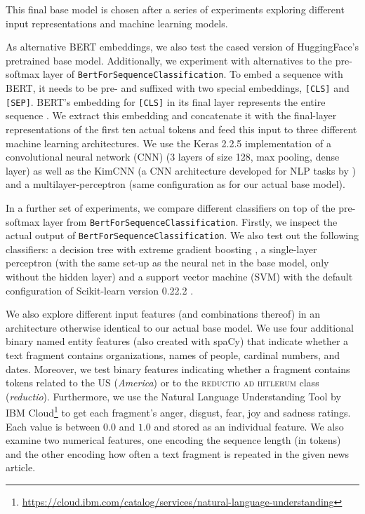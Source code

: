 \documentclass[11pt]{article}
\begin{document}
This final base model is chosen after a series of experiments exploring different input representations and machine learning models.

As alternative BERT embeddings, we also test the cased version of HuggingFace's pretrained base model.
Additionally, we experiment with alternatives to the pre-softmax layer of \texttt{BertForSequenceClassification}.
To embed a sequence with BERT, it needs to be pre- and suffixed with two special embeddings, \texttt{[CLS]} and \texttt{[SEP]}.
BERT's embedding for \texttt{[CLS]} in its final layer represents the entire sequence \cite{devlin2019bert}.
We extract this embedding and concatenate it with the final-layer representations of the first ten actual tokens and feed this input to three different machine learning architectures.
We use the Keras 2.2.5 implementation of a convolutional neural network (CNN) (3 layers of size 128, max pooling, dense layer)  as well as the KimCNN (a CNN architecture developed for NLP tasks by ) and a multilayer-perceptron (same configuration as for our actual base model).

In a further set of experiments, we compare different classifiers on top of the pre-softmax layer from \texttt{BertForSequenceClassification}.
Firstly, we inspect the actual output of \texttt{BertForSequenceClassification}.
We also test out the following classifiers: a decision tree with extreme gradient boosting \cite{chen2016xgboost}, a single-layer perceptron (with the same set-up as the neural net in the base model, only without the hidden layer) and a support vector machine (SVM) with the default configuration of Scikit-learn version 0.22.2 \cite{scikit-learn}.

We also explore different input features (and combinations thereof) in an architecture otherwise identical to our actual base model.
We use four additional binary named entity features (also created with spaCy) that indicate whether a text fragment contains organizations, names of people, cardinal numbers, and dates.
Moreover, we test binary features indicating whether a fragment contains tokens related to the US (\textit{America}) or to the \textsc{reductio ad hitlerum} class (\textit{reductio}).
Furthermore, we use the Natural Language Understanding Tool by IBM Cloud\footnote{\url{https://cloud.ibm.com/catalog/services/natural-language-understanding}} to get each fragment's anger, disgust, fear, joy and sadness ratings.
Each value is between $0.0$ and $1.0$ and stored as an individual feature.
We also examine two numerical features, one encoding the sequence length (in tokens) and the other encoding how often a text fragment is repeated in the given news article.
\end{document}
